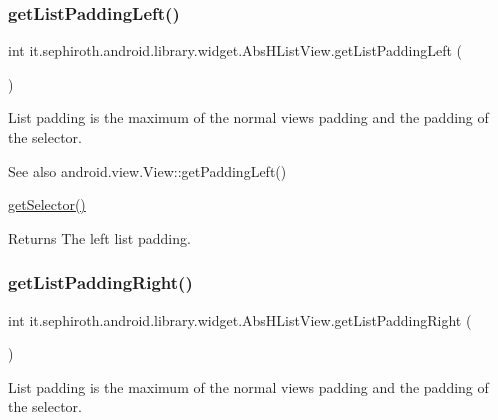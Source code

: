 \subsubsection{\texorpdfstring{get\+List\+Padding\+Left()}{getListPaddingLeft()}}
{\footnotesize\ttfamily int it.\+sephiroth.\+android.\+library.\+widget.\+Abs\+H\+List\+View.\+get\+List\+Padding\+Left (\begin{DoxyParamCaption}{ }\end{DoxyParamCaption})}

List padding is the maximum of the normal view\textquotesingle{}s padding and the padding of the selector.

\begin{DoxySeeAlso}{See also}
android.\+view.\+View\+::get\+Padding\+Left() 

\hyperlink{classit_1_1sephiroth_1_1android_1_1library_1_1widget_1_1_abs_h_list_view_a6e3c39f3a58ba45b9c720648bea7086f}{get\+Selector()}
\end{DoxySeeAlso}
\begin{DoxyReturn}{Returns}
The left list padding. 
\end{DoxyReturn}
\mbox{\label{classit_1_1sephiroth_1_1android_1_1library_1_1widget_1_1_abs_h_list_view_a9fcd02d554edb88f79be034b91e0528e}} 
\subsubsection{\texorpdfstring{get\+List\+Padding\+Right()}{getListPaddingRight()}}
{\footnotesize\ttfamily int it.\+sephiroth.\+android.\+library.\+widget.\+Abs\+H\+List\+View.\+get\+List\+Padding\+Right (\begin{DoxyParamCaption}{ }\end{DoxyParamCaption})}

List padding is the maximum of the normal view\textquotesingle{}s padding and the padding of the selector.


